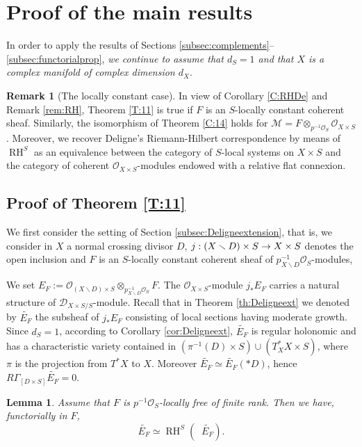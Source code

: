 \documentclass[english]{smfart}
\numberwithin{subsection}{section}
\def\shd{\mathcal{D}}\let\cD\shd
\def\shm{\mathcal{M}}
\def\sho{\mathcal{O}}\let\cO\sho
\DeclareMathOperator{\RH}{RH}
\newcommand{\XS}{X\times S}
\newcommand{\DXS}{\shd_{\XS/S}}
\DeclareMathOperator{\pSol}{{}^\mathrm{p}Sol}
\let\tilde\widetilde
\let\setminus\smallsetminus
\newcommand{\pOS}{p^{-1}\sho_S}
\numberwithin{equation}{section}
\theoremstyle{plain}
\newtheorem{lemma}[equation]{Lemma}
\theoremstyle{definition}
\newtheorem{remark}[equation]{Remark}
\def\to{\mathchoice{\longrightarrow}{\rightarrow}{\rightarrow}{\rightarrow}}
\begin{document}
\section{Proof of the main results}

In order to apply the results of Sections \ref{subsec:complements}--\ref{subsec:functorialprop}, \emph{we continue to assume that $d_S=1$ and that $X$ is a complex manifold of complex dimension $d_X$}.

\begin{remark}[The locally constant case]
In view of Corollary \ref{C:RHDe} and Remark \ref{rem:RH}, Theorem \ref{T:11} is true if $F$ is an $S$-locally constant coherent sheaf. Similarly, the isomorphism of Theorem \ref{C:14} holds for $\shm=F\otimes_{\pOS}\cO_{\XS}$. Moreover, we recover Deligne's Riemann-Hilbert correspondence by means of $\RH^S$ as an equivalence between the category of $S$-local systems on $\XS$ and the category of coherent $\sho_{\XS}$-modules endowed with a relative flat connexion.
\end{remark}

\subsection{Proof of Theorem \ref{T:11}}
We first consider the setting of Section \ref{subsec:Deligneextension}, that is, we consider in $X$ a normal crossing divisor $D$, $j: (X\setminus D)\times S\to \XS$ denotes the open inclusion and $F$ is an $S$-locally constant coherent sheaf of $p^{-1}_{X\setminus D}\sho_S$-modules,

We set $E_F:=\sho_{(X\setminus D)\times S}\otimes_{p^{-1}_{X\setminus D}\sho_S}F$. The $\cO_{\XS}$-module $j_*E_F$ carries a natural structure of $\DXS$-module. Recall that in Theorem \ref{th:Deligneext} we denoted by $\tilde{E_F}$ the subsheaf of $j_*E_F$ consisting of local sections having moderate growth. Since $d_S=1$, according to Corollary \ref{cor:Deligneext}, $\tilde{E_F}$ is regular holonomic and has a characteristic variety contained in
\hbox{$(\pi^{-1}(D)\times S)\cup(T^*_{X} \XS)$}, where $\pi$ is the projection from $T^*X$ to $X$. Moreover $\tilde{E_F}\simeq \tilde{E_F}(*D)$, hence $R\Gamma_{[D\times S]}\tilde{E_F}=0$.

\begin{lemma}\label{RHV}
Assume that $F$ is $\pOS$-locally free of finite rank. Then we have, functorially in $F$,
$$\tilde{E_F}\simeq\RH^S(\pSol\tilde{E_F}).$$
\end{lemma}
\end{document}
